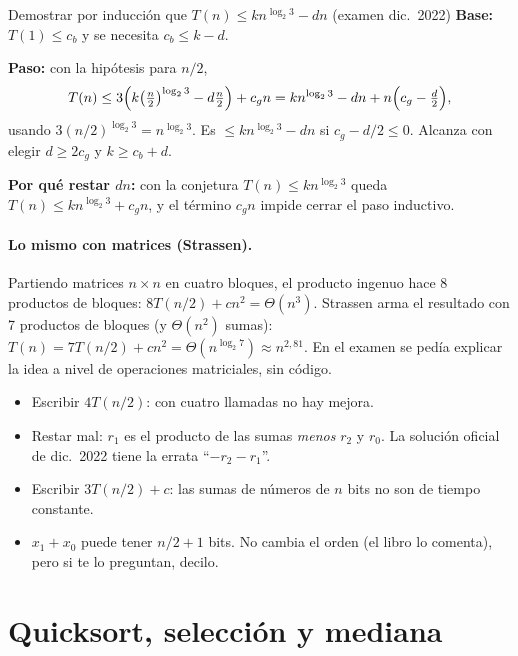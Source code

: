 \begin{problema}{Demostrar por inducción que $T(n)\le kn^{\log_2 3}-dn$ (examen dic.~2022)}
\textbf{Base:} $T(1)\le c_b$ y se necesita $c_b\le k-d$.

\textbf{Paso:} con la hipótesis para $n/2$,
\[
T(n)\le 3\Bigl(k\bigl(\tfrac n2\bigr)^{\log_2 3}-d\tfrac n2\Bigr)+c_gn
= kn^{\log_2 3}-dn+n\Bigl(c_g-\tfrac d2\Bigr),
\]
usando $3(n/2)^{\log_2 3}=n^{\log_2 3}$. Es $\le kn^{\log_2 3}-dn$ si $c_g-d/2\le 0$. Alcanza con elegir $d\ge 2c_g$ y $k\ge c_b+d$.

\textbf{Por qué restar $dn$:} con la conjetura $T(n)\le kn^{\log_2 3}$ queda $T(n)\le kn^{\log_2 3}+c_gn$, y el término $c_gn$ impide cerrar el paso inductivo.
\end{problema}

\paragraph{Lo mismo con matrices (Strassen).} Partiendo matrices $n\times n$ en cuatro bloques, el producto ingenuo hace 8 productos de bloques: $8T(n/2)+cn^2=\Theta(n^3)$. Strassen arma el resultado con 7 productos de bloques (y $\Theta(n^2)$ sumas): $T(n)=7T(n/2)+cn^2=\Theta(n^{\log_2 7})\approx n^{2{,}81}$. En el examen se pedía explicar la idea a nivel de operaciones matriciales, sin código.

\begin{trampa}
\begin{itemize}
  \item Escribir $4T(n/2)$: con cuatro llamadas no hay mejora.
  \item Restar mal: $r_1$ es el producto de las sumas \emph{menos} $r_2$ y $r_0$. La solución oficial de dic.~2022 tiene la errata ``$-r_2-r_1$''.
  \item Escribir $3T(n/2)+c$: las sumas de números de $n$ bits no son de tiempo constante.
  \item $x_1+x_0$ puede tener $n/2+1$ bits. No cambia el orden (el libro lo comenta), pero si te lo preguntan, decilo.
\end{itemize}
\end{trampa}

\section{Quicksort, selección y mediana}


